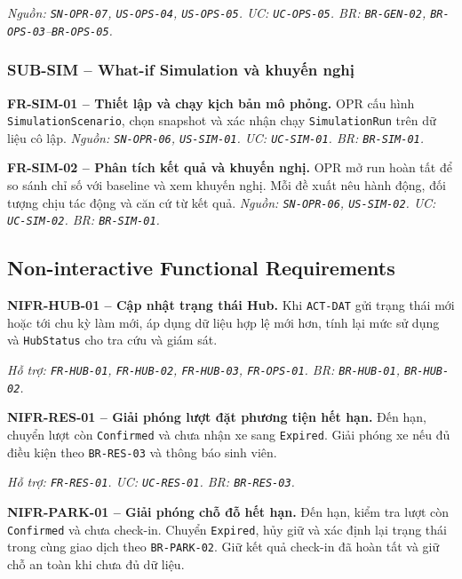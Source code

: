 \textit{Nguồn: \texttt{SN-OPR-07}, \texttt{US-OPS-04}, \texttt{US-OPS-05}. UC: \texttt{UC-OPS-05}. BR: \texttt{BR-GEN-02}, \texttt{BR-OPS-03}--\texttt{BR-OPS-05}.}

\subsubsection{SUB-SIM -- What-if Simulation và khuyến nghị}

\noindent\textbf{FR-SIM-01 -- Thiết lập và chạy kịch bản mô phỏng.} OPR cấu hình \texttt{SimulationScenario}, chọn snapshot và xác nhận chạy \texttt{SimulationRun} trên dữ liệu cô lập.
\textit{Nguồn: \texttt{SN-OPR-06}, \texttt{US-SIM-01}. UC: \texttt{UC-SIM-01}. BR: \texttt{BR-SIM-01}.}

\medskip
\noindent\textbf{FR-SIM-02 -- Phân tích kết quả và khuyến nghị.} OPR mở run hoàn tất để so sánh chỉ số với baseline và xem khuyến nghị. Mỗi đề xuất nêu hành động, đối tượng chịu tác động và căn cứ từ kết quả.
\textit{Nguồn: \texttt{SN-OPR-06}, \texttt{US-SIM-02}. UC: \texttt{UC-SIM-02}. BR: \texttt{BR-SIM-01}.}

\subsection{Non-interactive Functional Requirements}

\noindent\textbf{NIFR-HUB-01 -- Cập nhật trạng thái Hub.} Khi \texttt{ACT-DAT} gửi trạng thái mới hoặc tới chu kỳ làm mới, áp dụng dữ liệu hợp lệ mới hơn, tính lại mức sử dụng và \texttt{HubStatus} cho tra cứu và giám sát.

\textit{Hỗ trợ: \texttt{FR-HUB-01}, \texttt{FR-HUB-02}, \texttt{FR-HUB-03}, \texttt{FR-OPS-01}. BR: \texttt{BR-HUB-01}, \texttt{BR-HUB-02}.}

\medskip
\noindent\textbf{NIFR-RES-01 -- Giải phóng lượt đặt phương tiện hết hạn.} Đến hạn, chuyển lượt còn \texttt{Confirmed} và chưa nhận xe sang \texttt{Expired}. Giải phóng xe nếu đủ điều kiện theo \texttt{BR-RES-03} và thông báo sinh viên.

\textit{Hỗ trợ: \texttt{FR-RES-01}. UC: \texttt{UC-RES-01}. BR: \texttt{BR-RES-03}.}

\medskip
\noindent\textbf{NIFR-PARK-01 -- Giải phóng chỗ đỗ hết hạn.} Đến hạn, kiểm tra lượt còn \texttt{Confirmed} và chưa check-in. Chuyển \texttt{Expired}, hủy giữ và xác định lại trạng thái trong cùng giao dịch theo \texttt{BR-PARK-02}. Giữ kết quả check-in đã hoàn tất và giữ chỗ an toàn khi chưa đủ dữ liệu.


